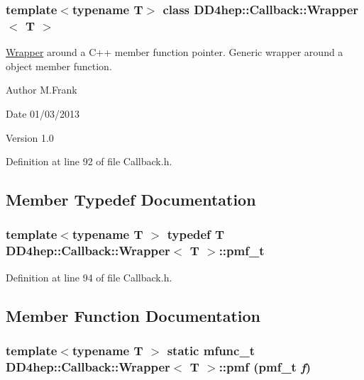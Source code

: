 \subsubsection*{template$<$typename T$>$ class DD4hep::Callback::Wrapper$<$ T $>$}

\hyperlink{class_d_d4hep_1_1_callback_1_1_wrapper}{Wrapper} around a C++ member function pointer. Generic wrapper around a object member function.

\begin{DoxyAuthor}{Author}
M.Frank 
\end{DoxyAuthor}
\begin{DoxyDate}{Date}
01/03/2013 
\end{DoxyDate}
\begin{DoxyVersion}{Version}
1.0 
\end{DoxyVersion}


Definition at line 92 of file Callback.h.

\subsection{Member Typedef Documentation}
\hypertarget{class_d_d4hep_1_1_callback_1_1_wrapper_ab266379df9f395d1221b2adbf62b112c}{
\subsubsection[{pmf\_\-t}]{\setlength{\rightskip}{0pt plus 5cm}template$<$typename T $>$ typedef {\bf T} {\bf DD4hep::Callback::Wrapper}$<$ {\bf T} $>$::{\bf pmf\_\-t}}}
\label{class_d_d4hep_1_1_callback_1_1_wrapper_ab266379df9f395d1221b2adbf62b112c}


Definition at line 94 of file Callback.h.

\subsection{Member Function Documentation}
\hypertarget{class_d_d4hep_1_1_callback_1_1_wrapper_a99e377622ec6bc663c3165a504b5011b}{
\subsubsection[{pmf}]{\setlength{\rightskip}{0pt plus 5cm}template$<$typename T $>$ static {\bf mfunc\_\-t} {\bf DD4hep::Callback::Wrapper}$<$ {\bf T} $>$::pmf ({\bf pmf\_\-t} {\em f})}}
\label{class_d_d4hep_1_1_callback_1_1_wrapper_a99e377622ec6bc663c3165a504b5011b}


